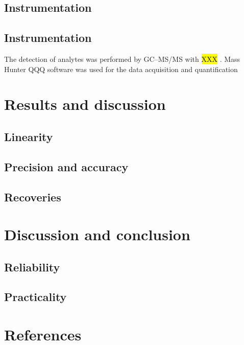 \documentclass[journal=jacsat,manuscript=article]{achemso}
\begin{document}
\subsection{Instrumentation}




\subsection{Instrumentation}

The detection of analytes was performed by GC–MS/MS with \hl {XXX} . Mass Hunter QQQ  software was used for the data acquisition and quantification \cite{del2007liquid}



\section{Results and discussion}
\subsection{Linearity}
\subsection{Precision and accuracy}
\subsection{Recoveries}

\section{Discussion and conclusion}
\subsection{Reliability}
\subsection{Practicality}



\section{References}
\printbibliography
\end{document}
